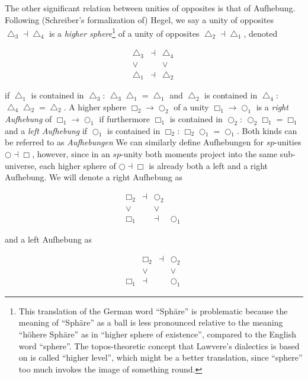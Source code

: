 \documentclass{article}
\begin{document}
The other significant relation between unities of opposites is that of Aufhebung. Following (Schreiber's formalization of) Hegel, we say a unity of opposites $\bigtriangleup_3\dashv\bigtriangleup_4$ is a \emph{higher sphere}\footnote{This translation of the German word ``Sphäre'' is problematic because the meaning of ``Sphäre'' as a ball is less pronounced relative to the meaning ``höhere Sphäre'' as in ``higher sphere of existence'', compared to the English word ``sphere''. The topos-theoretic concept that Lawvere's dialectics is based on is called ``higher level'', which might be a better translation, since ``sphere'' too much invokes the image of something round.} of a unity of opposites $\bigtriangleup_2\dashv\bigtriangleup_1$, denoted 

$$
  \begin{array}{ccc}
    \bigtriangleup_3 & \dashv & \bigtriangleup_4
    \\
    \vee & & \vee
    \\
    \bigtriangleup_1 & \dashv & \bigtriangleup_2
    \end{array}
  \ 
$$

if $\bigtriangleup_1$ is contained in $\bigtriangleup_3$: $\bigtriangleup_3\bigtriangleup_1=\bigtriangleup_1$ and $\bigtriangleup_2$ is contained in $\bigtriangleup_4$: $\bigtriangleup_4\bigtriangleup_2=\bigtriangleup_2$. A higher sphere $\Box_2\rightarrow\bigcirc_2$ of a unity $\Box_1\rightarrow\bigcirc_1$ is a \emph{right Aufhebung} of $\Box_1\rightarrow\bigcirc_1$ if furthermore $\Box_1$ is contained in $\bigcirc_2$: $\bigcirc_2\Box_1=\Box_1$ and a \emph{left Aufhebung} if $\bigcirc_1$ is contained in $\Box_2$: $\Box_2\bigcirc_1=\bigcirc_1$. Both kinds can be referred to as \emph{Aufhebungen} We can similarly define Aufhebungen for $sp$-unities $\bigcirc\dashv\Box$, however, since in an $sp$-unity both moments project into the same sub-universe, each higher sphere of $\bigcirc\dashv\Box$ is already both a left and a right Aufhebung. We will denote a right Aufhebung as

$$
  \begin{array}{cccc}
    \Box_2 &\dashv& \bigcirc_2
    \\
    \vee & & \vee
    \\
    \Box_1 & & \dashv& \bigcirc_1
    \end{array}
  \ 
$$

and a left Aufhebung as

$$
  \begin{array}{cccc}
     & \Box_2 & \dashv & \bigcirc_2
    \\
     & \vee & & \vee
    \\
    \Box_1 & \dashv & & \bigcirc_1
    \end{array}
  \ 
$$
\end{document}
